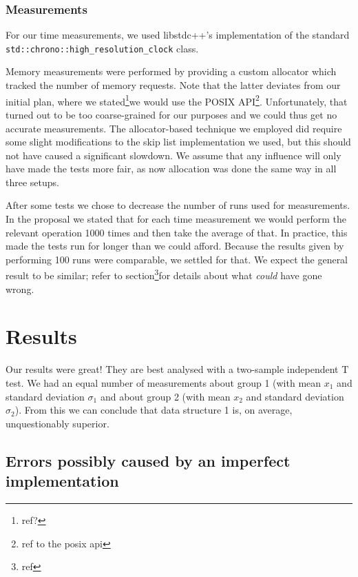 \documentclass[12pt,a4paper]{article}
\begin{document}
	\subsubsection*{Measurements}
    For our time measurements, we used libstdc++'s implementation of the standard
    \texttt{std::chrono::high\_resolution\_clock} class.
    
    Memory measurements were performed by providing a custom allocator which tracked the number of memory
    requests.  Note that the latter deviates from our initial plan, where we stated\footnote{ref?}we would
    use the POSIX API\footnote{ref to the posix api}.  Unfortunately, that turned out to be too
    coarse-grained for our purposes and we could thus get no accurate measurements.  The
    allocator-based technique we employed did require some slight modifications to the skip list
    implementation we used, but this should not have caused a significant slowdown. We assume that any 
    influence will only have made the tests more fair, as now allocation was done the same way in all 
    three setups.

    After some tests we chose to decrease the number of runs used for measurements.  In the
    proposal we stated that for each time measurement we would perform the relevant operation 1000
    times and then take the average of that.  In practice, this made the tests run for longer than
    we could afford. Because the results given by performing 100 runs were comparable, we settled for that.  
    We expect the general result to be similar; refer to section\footnote{ref}for details
    about what \emph{could} have gone wrong.

    \section{Results}

    Our results were great!  They are best analysed with a two-sample independent T test.  We had an
    equal number of measurements about group 1 (with mean $x_1$ and standard deviation $\sigma_1$ and
    about group 2 (with mean $x_2$ and standard deviation $\sigma_2$).  From this we can conclude that
    data structure 1 is, on average, unquestionably superior.

    \subsection{Errors possibly caused by an imperfect implementation}
\end{document}

